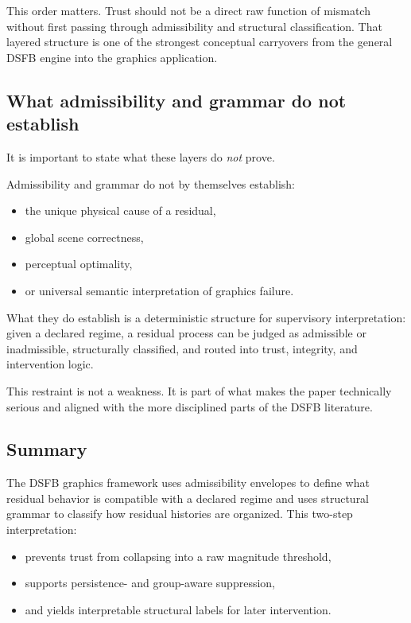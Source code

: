 \documentclass[11pt]{article}
\theoremstyle{definition}
\theoremstyle{plain}
\begin{document}
This order matters. Trust should not be a direct raw function of mismatch without first passing through admissibility and structural classification. That layered structure is one of the strongest conceptual carryovers from the general DSFB engine into the graphics application.


\subsection{What admissibility and grammar do not establish}

It is important to state what these layers do \emph{not} prove.

Admissibility and grammar do not by themselves establish:
\begin{itemize}[leftmargin=1.5em]
    \item the unique physical cause of a residual,
    \item global scene correctness,
    \item perceptual optimality,
    \item or universal semantic interpretation of graphics failure.
\end{itemize}

What they do establish is a deterministic structure for supervisory interpretation: given a declared regime, a residual process can be judged as admissible or inadmissible, structurally classified, and routed into trust, integrity, and intervention logic.

This restraint is not a weakness. It is part of what makes the paper technically serious and aligned with the more disciplined parts of the DSFB literature. 


\subsection{Summary}

The DSFB graphics framework uses admissibility envelopes to define what residual behavior is compatible with a declared regime and uses structural grammar to classify how residual histories are organized. This two-step interpretation:
\begin{itemize}[leftmargin=1.5em]
    \item prevents trust from collapsing into a raw magnitude threshold,
    \item supports persistence- and group-aware suppression,
    \item and yields interpretable structural labels for later intervention.
\end{itemize}
\end{document}
